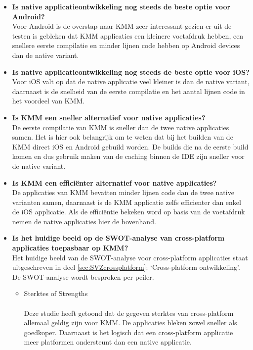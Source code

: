 \begin{itemize}
    \item \textbf{Is native applicatieontwikkeling nog steeds de beste optie voor Android?}\\
    Voor Android is de overstap naar KMM zeer interessant gezien er uit de testen is gebleken dat KMM applicaties een kleinere voetafdruk hebben, een snellere eerste compilatie en minder lijnen code hebben op Android devices dan de native variant.
    \\
    \item \textbf{Is native applicatieontwikkeling nog steeds de beste optie voor iOS?}\\
    Voor iOS valt op dat de native applicatie veel kleiner is dan de native variant, daarnaast is de snelheid van de eerste compilatie en het aantal lijnen code in het voordeel van KMM.
    \\
    \item \textbf{Is KMM een sneller alternatief voor native applicaties?}\\
    De eerste compilatie van KMM is sneller dan de twee native applicaties samen. Het is hier ook belangrijk om te weten dat bij het builden van de KMM direct iOS en Android gebuild worden. De builds die na de eerste build komen en dus gebruik maken van de caching binnen de IDE zijn sneller voor de native variant.
    \\
    \item \textbf{Is KMM een efficiënter alternatief voor native applicaties?}\\
    De applicaties van KMM bevatten minder lijnen code dan de twee native varianten samen, daarnaast is de KMM applicatie zelfs efficienter dan enkel de iOS applicatie. Als de efficiëntie bekeken word op basis van de voetafdruk nemen de native applicaties hier de bovenhand.
    \\
    \item \textbf{Is het huidige beeld op de SWOT-analyse van cross-platform applicaties toepasbaar op KMM?}\\
    Het huidige beeld van de SWOT-analyse voor cross-platform applicaties staat uitgeschreven in deel \ref{sec:SVZcrossplatform}: `Cross-platform ontwikkeling'. De SWOT-analyse wordt besproken per peiler.
    \begin{itemize}
        \item Sterktes of Strengths\\
        \\
        Deze studie heeft getoond dat de gegeven sterktes van cross-platform allemaal geldig zijn voor KMM. De applicaties bleken zowel sneller als goedkoper. Daarnaast is het logisch dat een cross-platform applicatie meer platformen ondersteunt dan een native applicatie.

\end{itemize}
\end{itemize}
